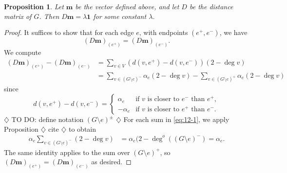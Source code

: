\documentclass{amsart}
\newtheorem{prop}[thm]{Proposition}
\theoremstyle{definition}
\newcommand{\bone}{\mathbf{1}}
\newcommand{\boldm}{\mathbf{m}}
\newcommand{\degout}{\deg^o}
\newcommand{\note}[1]{{\color{red} \sf $\diamondsuit$  {#1} $\diamondsuit$ }}
\begin{document}
\begin{prop}
\label{prop:m-distance-warmup}
Let $\boldm$ be the vector defined above,
and let $D$ be the distance matrix of $G$.
Then $D \boldm = \lambda \bone$
for some constant $\lambda$.
\end{prop}
\begin{proof}

It suffices to show that for each edge $e$, with endpoints $(e^+,e^-)$, we have
\[ 
(D \boldm)_{(e^+)} = (D \boldm)_{(e^-)} .
\]
We compute
\begin{align}
(D \boldm)_{(e^+)} - (D \boldm)_{(e^-)} &= \sum_{v \in V} (d(v,e^+) - d(v,e^-)) (2 - \deg v) \\
&= \sum_{v\in (G\setminus e)^-}  \alpha_e (2 - \deg v)  - \sum_{v\in (G\setminus e)^+} \alpha_e (2 - \deg v) 
\label{eq:12-1}
\end{align}
since
\[
d(v,e^+) - d(v,e^-) = \begin{cases}
\alpha_e &\text{if $v$ is closer to $e^-$ than }e^+,\\
- \alpha_e &\text{if $v$ is closer to $e^+$ than }e^-.
\end{cases}
\]
\note{TO DO: define notation $(G \setminus e)^\pm$}
For each sum in \eqref{eq:12-1}, we apply Proposition \note{cite} to obtain
\begin{align}
\alpha_e \sum_{v\in (G\setminus e)^-}  (2 - \deg v)&= \alpha_e (2 - \degout( (G\setminus e)^-) 
= \alpha_e .
\end{align}
The same identity applies to the sum over $(G \setminus e)^+$, so $(D\boldm)_{(e^+)} = (D\boldm)_{(e^-)}$ as desired.
\end{proof}
\end{document}
